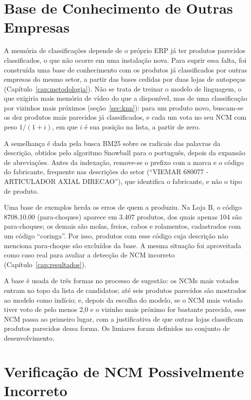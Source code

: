 \section{Base de Conhecimento de Outras Empresas}
\label{sec:conhecimento}

A memória de classificações depende de o próprio ERP já ter produtos parecidos classificados, o que não ocorre em uma instalação nova. Para suprir essa falta, foi construída uma base de conhecimento com os produtos já classificados por outras empresas do mesmo setor, a partir das bases cedidas por duas lojas de autopeças (Capítulo~\ref{cap:metodologia}). Não se trata de treinar o modelo de linguagem, o que exigiria mais memória de vídeo do que a disponível, mas de uma classificação por vizinhos mais próximos (seção~\ref{sec:knn}): para um produto novo, buscam-se os dez produtos mais parecidos já classificados, e cada um vota no seu NCM com peso $1/(1+i)$, em que $i$ é sua posição na lista, a partir de zero.

A semelhança é dada pela busca BM25 sobre os radicais das palavras da descrição, obtidos pelo algoritmo Snowball para o português, depois da expansão de abreviações. Antes da indexação, remove-se o prefixo com a marca e o código do fabricante, frequente nas descrições do setor (``VIEMAR 680077 - ARTICULADOR AXIAL DIRECAO''), que identifica o fabricante, e não o tipo de produto.

Uma base de exemplos herda os erros de quem a produziu. Na Loja B, o código 8708.10.00 (para-choques) aparece em 3.407 produtos, dos quais apenas 104 são para-choques; os demais são molas, freios, cabos e rolamentos, cadastrados com um código ``coringa''. Por isso, produtos com esse código cuja descrição não menciona para-choque são excluídos da base. A mesma situação foi aproveitada como caso real para avaliar a detecção de NCM incorreto (Capítulo~\ref{cap:resultados}).

A base é usada de três formas no processo de sugestão: os NCMs mais votados entram no topo da lista de candidatos; até seis produtos parecidos são mostrados ao modelo como indício; e, depois da escolha do modelo, se o NCM mais votado tiver voto de pelo menos 2,0 e o vizinho mais próximo for bastante parecido, esse NCM passa ao primeiro lugar, com a justificativa de que outras lojas classificam produtos parecidos dessa forma. Os limiares foram definidos no conjunto de desenvolvimento.

\section{Verificação de NCM Possivelmente Incorreto}
\label{sec:verificacao}

